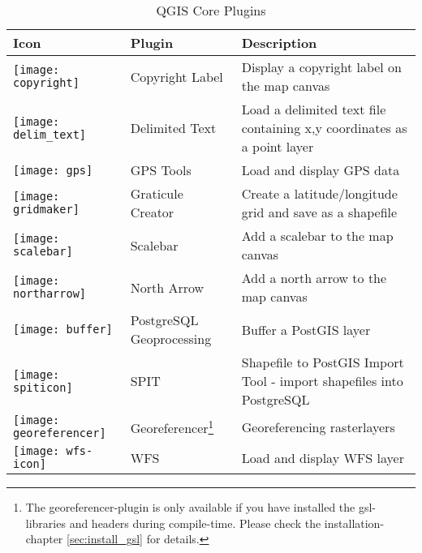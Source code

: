 \begin{minipage}{\textwidth}
\begin{table}[H]
\centering
\caption{QGIS Core Plugins}\label{tab:core_plugins}\medskip
\small
 \begin{tabular}{|l|l|p{4in}|}
\hline \textbf{Icon} & \textbf{Plugin} & \textbf{Description} \\
\hline 
\texttt{[image: copyright]} & Copyright Label \index{plugins!copyright}& Display a copyright label on the map canvas\\
\hline 
\texttt{[image: delim\_text]} & Delimited Text \index{plugins!delimited text}& Load a delimited text file containing x,y coordinates as a point layer \\
\hline 
\texttt{[image: gps]} & GPS Tools \index{plugins!gps}& Load and display GPS data \\
\hline 
\texttt{[image: gridmaker]} & Graticule Creator \index{plugins!graticule}& Create a latitude/longitude grid and save as a shapefile\\
\hline 
\texttt{[image: scalebar]} & Scalebar \index{plugins!scalebar}& Add a scalebar to the map canvas\\
\hline 
\texttt{[image: northarrow]}& North Arrow \index{plugins!north arrow}& Add a north arrow to the map canvas\\
\hline 
\texttt{[image: buffer]} & PostgreSQL Geoprocessing \index{plugins!geoprocessing}& Buffer a PostGIS layer \\
\hline 
\texttt{[image: spiticon]} & SPIT \index{plugins!SPIT}& Shapefile to PostGIS Import Tool - import shapefiles into PostgreSQL\\
\hline
\texttt{[image: georeferencer]} & Georeferencer\footnote{The georeferencer-plugin is only available if you have installed the gsl-libraries and headers during compile-time. Please check the installation-chapter \ref{sec:install_gsl} for details.} \index{plugin!Georeferencer} & Georeferencing rasterlayers \\
\hline
\texttt{[image: wfs-icon]} & WFS & Load and display WFS layer \\
\hline
\end{tabular}
\end{table}
\end{minipage}

\normalsize


